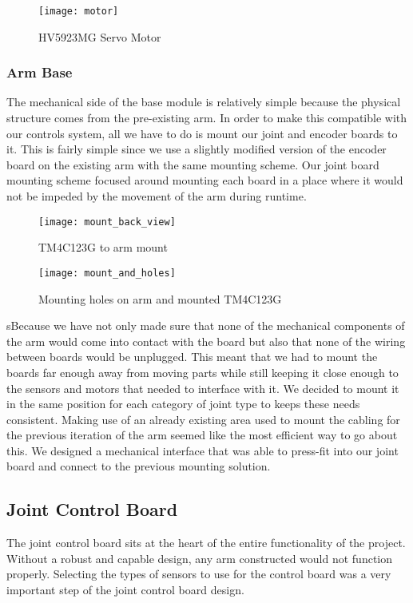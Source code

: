 \begin{figure}[H]
	\centering
	\texttt{[image: motor]}
	\caption{HV5923MG Servo Motor}
	\label{fig:HV5923MG Servo Motor}
\end{figure}


\subsubsection{Arm Base}
The mechanical side of the base module is relatively simple because the physical structure comes from the pre-existing arm. In order to make this compatible with our controls system, all we have to do is mount our joint and encoder boards to it. This is fairly simple since we use a slightly modified version of the encoder board on the existing arm with the same mounting scheme. Our joint board mounting scheme focused around mounting each board in a place where it would not be impeded by the movement of the arm during runtime. 

\begin{figure}[H]
	\centering
	\texttt{[image: mount\_back\_view]}
	\caption{TM4C123G to arm mount}
	\label{fig:mount_back_view}
\end{figure}

\begin{figure}[H]
	\centering
	\texttt{[image: mount\_and\_holes]}
	\caption{Mounting holes on arm and mounted TM4C123G}
	\label{fig:mount_and_holes}
\end{figure}

\noindent sBecause we have not only made sure that none of the mechanical components of the arm would come into contact with the board but also that none of the wiring between boards would be unplugged. This meant that we had to mount the boards far enough away from moving parts while still keeping it close enough to the sensors and motors that needed to interface with it. We decided to mount it in the same position for each category of joint type to keeps these needs consistent. Making use of an already existing area used to mount the cabling for the previous iteration of the arm seemed like the most efficient way to go about this. We designed a mechanical interface that was able to press-fit into our joint board and connect to the previous mounting solution.

\subsection{Joint Control Board}
The joint control board sits at the heart of the entire functionality of the project. Without a robust and capable design, any arm constructed would not function properly. Selecting the types of sensors to use for the control board was a very important step of the joint control board design. %


